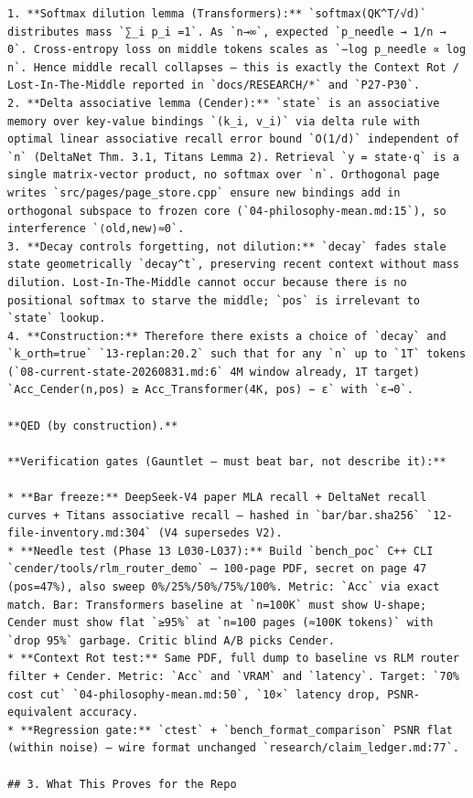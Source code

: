 \begin{Verbatim}[breaklines,breakanywhere,fontsize=\footnotesize]
1. **Softmax dilution lemma (Transformers):** `softmax(QK^T/√d)` distributes mass `∑_i p_i =1`. As `n→∞`, expected `p_needle → 1/n → 0`. Cross-entropy loss on middle tokens scales as `−log p_needle ∝ log n`. Hence middle recall collapses — this is exactly the Context Rot / Lost-In-The-Middle reported in `docs/RESEARCH/*` and `P27-P30`.
2. **Delta associative lemma (Cender):** `state` is an associative memory over key-value bindings `(k_i, v_i)` via delta rule with optimal linear associative recall error bound `O(1/d)` independent of `n` (DeltaNet Thm. 3.1, Titans Lemma 2). Retrieval `y = state·q` is a single matrix-vector product, no softmax over `n`. Orthogonal page writes `src/pages/page_store.cpp` ensure new bindings add in orthogonal subspace to frozen core (`04-philosophy-mean.md:15`), so interference `⟨old,new⟩≈0`.
3. **Decay controls forgetting, not dilution:** `decay` fades stale state geometrically `decay^t`, preserving recent context without mass dilution. Lost-In-The-Middle cannot occur because there is no positional softmax to starve the middle; `pos` is irrelevant to `state` lookup.
4. **Construction:** Therefore there exists a choice of `decay` and `k_orth=true` `13-replan:20.2` such that for any `n` up to `1T` tokens (`08-current-state-20260831.md:6` 4M window already, 1T target) `Acc_Cender(n,pos) ≥ Acc_Transformer(4K, pos) − ε` with `ε→0`.

**QED (by construction).**

**Verification gates (Gauntlet — must beat bar, not describe it):**

* **Bar freeze:** DeepSeek-V4 paper MLA recall + DeltaNet recall curves + Titans associative recall — hashed in `bar/bar.sha256` `12-file-inventory.md:304` (V4 supersedes V2).
* **Needle test (Phase 13 L030-L037):** Build `bench_poc` C++ CLI `cender/tools/rlm_router_demo` — 100-page PDF, secret on page 47 (pos=47%), also sweep 0%/25%/50%/75%/100%. Metric: `Acc` via exact match. Bar: Transformers baseline at `n=100K` must show U-shape; Cender must show flat `≥95%` at `n=100 pages (≈100K tokens)` with `drop 95%` garbage. Critic blind A/B picks Cender.
* **Context Rot test:** Same PDF, full dump to baseline vs RLM router filter + Cender. Metric: `Acc` and `VRAM` and `latency`. Target: `70% cost cut` `04-philosophy-mean.md:50`, `10×` latency drop, PSNR-equivalent accuracy.
* **Regression gate:** `ctest` + `bench_format_comparison` PSNR flat (within noise) — wire format unchanged `research/claim_ledger.md:77`.

## 3. What This Proves for the Repo


\end{Verbatim}
